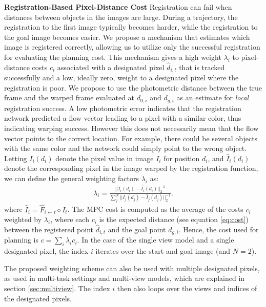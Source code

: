\noindent \textbf{Registration-Based Pixel-Distance Cost}
Registration can fail when distances between objects in the images are large. During a trajectory, the registration to the first image typically becomes harder, while the registration to the goal image becomes easier. We propose a mechanism that estimates which image is registered correctly, allowing us to utilize only the successful registration for evaluating the planning cost. This mechanism gives a high weight $\lambda_i$ to pixel-distance costs $c_i$ associated with a designated pixel $\hat{d}_{i,t}$ that is tracked successfully and a low, ideally zero, weight to a designated pixel where the registration is poor. We propose to use the photometric distance between the true frame and the warped frame evaluated at $d_{0,i}$ and $d_{g,i}$ as an estimate for \emph{local} registration success. A low photometric error indicates that the registration network predicted a flow vector leading to a pixel with a similar color, thus indicating warping success. However this does not necessarily mean that the flow vector points to the correct location. For example, there could be several objects with the same color and the network could simply point to the wrong object. Letting $I_i(d_i)$ denote the pixel value in image $I_i$ for position $d_i$, and $\hat{I}_i(d_i)$ denote the corresponding pixel in the image warped by the registration function, we can define the general weighting factors $\lambda_i$ as:
\begin{align}
\lambda_i =  \frac{||I_i(d_i) - \hat{I_i}(d_i)||_2^{-1}}{\sum^N_j ||I_j(d_j) - \hat{I}_j(d_j)||^{-1}_2}.
\label{eqn:cost_avg}
\end{align}
where $\hat{I}_i = \hat{F}_{i \leftarrow t} \diamond I_t$. The MPC cost is computed as the average of the costs $c_i$ weighted by $\lambda_i$, where each $c_i$ is the expected distance (see equation \ref{eq:cost}) between the registered point $\hat{d}_{i,t}$ and the goal point $d_{g,i}$. Hence, the cost used for planning is $c = \sum_i \lambda_i c_i$.  In the case of the single view model and a single designated pixel, the index $i$ iterates over the start and goal image (and $N=2$).

The proposed weighting scheme can also be used with multiple designated pixels, as used in multi-task settings and multi-view models, which are explained in section \ref{sec:multiview}. The index $i$ then also loops over the views and indices of the designated pixels.

